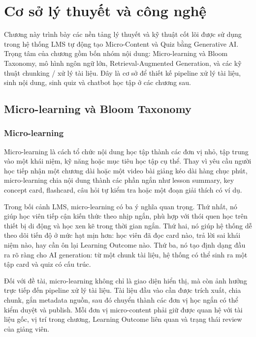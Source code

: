 \chapter{Cơ sở lý thuyết và công nghệ}
\label{chap:co-so-ly-thuyet-cong-nghe}

Chương này trình bày các nền tảng lý thuyết và kỹ thuật cốt lõi được sử dụng
trong hệ thống LMS tự động tạo Micro-Content và Quiz bằng Generative AI. Trọng
tâm của chương gồm bốn nhóm nội dung: Micro-learning và Bloom Taxonomy, mô hình
ngôn ngữ lớn, Retrieval-Augmented Generation, và các kỹ thuật chunking / xử lý
tài liệu. Đây là cơ sở để thiết kế pipeline xử lý tài liệu, sinh nội dung, sinh
quiz và chatbot học tập ở các chương sau.

\section{Micro-learning và Bloom Taxonomy}
\label{sec:microlearning-bloom}

\subsection{Micro-learning}
\label{subsec:microlearning}

Micro-learning là cách tổ chức nội dung học tập thành các đơn vị nhỏ, tập
trung vào một khái niệm, kỹ năng hoặc mục tiêu học tập cụ thể. Thay vì yêu cầu
người học tiếp nhận một chương dài hoặc một video bài giảng kéo dài hàng chục
phút, micro-learning chia nội dung thành các phần ngắn như lesson summary, key
concept card, flashcard, câu hỏi tự kiểm tra hoặc một đoạn giải thích có ví dụ.

Trong bối cảnh LMS, micro-learning có ba ý nghĩa quan trọng. Thứ nhất, nó giúp
học viên tiếp cận kiến thức theo nhịp ngắn, phù hợp với thói quen học trên
thiết bị di động và học xen kẽ trong thời gian ngắn. Thứ hai, nó giúp hệ thống
dễ theo dõi tiến độ ở mức hạt mịn hơn: học viên đã đọc card nào, trả lời sai
khái niệm nào, hay cần ôn lại Learning Outcome nào. Thứ ba, nó tạo định dạng
đầu ra rõ ràng cho AI generation: từ một chunk tài liệu, hệ thống có thể sinh
ra một tập card và quiz có cấu trúc.

Đối với đề tài, micro-learning không chỉ là giao diện hiển thị, mà còn ảnh
hưởng trực tiếp đến pipeline xử lý tài liệu. Tài liệu đầu vào cần được trích
xuất, chia chunk, gắn metadata nguồn, sau đó chuyển thành các đơn vị học ngắn
có thể kiểm duyệt và publish. Mỗi đơn vị micro-content phải giữ được quan hệ
với tài liệu gốc, vị trí trong chương, Learning Outcome liên quan và trạng thái
review của giảng viên.

